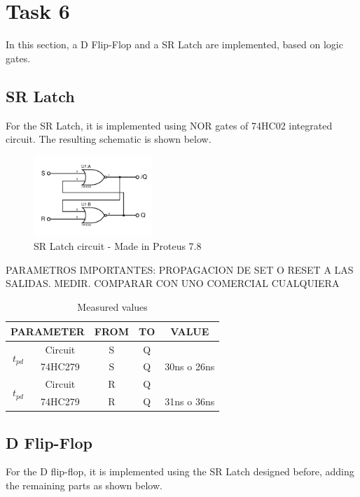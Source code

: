 \newpage

\section*{Task 6}
In this section, a D Flip-Flop and a SR Latch
are implemented, based on logic gates.
\subsection*{SR Latch}
For the SR Latch, it is 
implemented using NOR gates of 74HC02 integrated
circuit. The resulting schematic is shown below.

\begin{figure}[H]
    \begin{centering}
    \includegraphics[width=0.4\textwidth]{data/latchSR}
    \par\end{centering}
    \caption{SR Latch circuit - Made in Proteus 7.8}
\end{figure}

PARAMETROS IMPORTANTES: PROPAGACION DE SET O 
RESET A LAS SALIDAS. MEDIR. COMPARAR CON UNO
COMERCIAL CUALQUIERA

\begin{table}[H]
    \begin{center}
        \begin{tabular}{|c|c|c|c|c|}
            \hline 
            \multicolumn{2}{|c|}{PARAMETER} & FROM & TO & VALUE\tabularnewline
            \hline 
            \hline 
            \multirow{2}{*}{$t_{pd}$} & Circuit & S & Q & \tabularnewline
            \cline{2-5} 
             & 74HC279 & S & Q & 30ns o 26ns\tabularnewline
            \hline 
            \multirow{2}{*}{$t_{pd}$} & Circuit & R & Q & \tabularnewline
            \cline{2-5} 
             & 74HC279 & R & Q & 31ns o 36ns\tabularnewline
            \hline 
            \end{tabular}
    \caption{Measured values}
    \end{center}
\end{table}

\subsection*{D Flip-Flop}
For the D flip-flop, it is implemented using 
the SR Latch designed before, adding the 
remaining parts as shown below.

